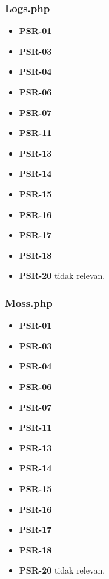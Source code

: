 \subsubsection{Logs.php}
\begin{itemize}
	\item \textbf{PSR-01} 
	\item \textbf{PSR-03}
	\item \textbf{PSR-04}
	\item \textbf{PSR-06}
	\item \textbf{PSR-07}
	\item \textbf{PSR-11}
	\item \textbf{PSR-13}
	\item \textbf{PSR-14}
	\item \textbf{PSR-15}
	\item \textbf{PSR-16}
	\item \textbf{PSR-17} 
	\item \textbf{PSR-18} 
	\item \textbf{PSR-20} tidak relevan.
\end{itemize}

\subsubsection{Moss.php}
\begin{itemize}
	\item \textbf{PSR-01} 
	\item \textbf{PSR-03}
	\item \textbf{PSR-04}
	\item \textbf{PSR-06}
	\item \textbf{PSR-07}
	\item \textbf{PSR-11}
	\item \textbf{PSR-13}
	\item \textbf{PSR-14}
	\item \textbf{PSR-15}
	\item \textbf{PSR-16}
	\item \textbf{PSR-17} 
	\item \textbf{PSR-18} 
	\item \textbf{PSR-20} tidak relevan.
\end{itemize}


